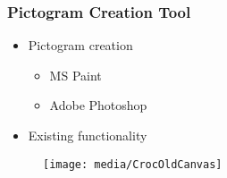 \begin{frame}
	\frametitle{Pictogram Creation Tool}
	\begin{itemize}
		\item Pictogram creation
		\begin{itemize}
			\item MS Paint
			\item Adobe Photoshop
		\end{itemize}
		\item Existing functionality
	\end{itemize}
	\begin{figure}
		\texttt{[image: media/CrocOldCanvas]}
	\end{figure}
\end{frame}